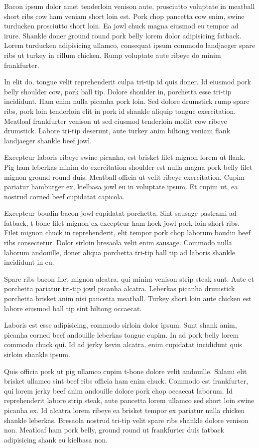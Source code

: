 Bacon ipsum dolor amet tenderloin venison aute, prosciutto voluptate in meatball short ribs cow ham veniam short loin est. Pork chop pancetta cow enim, swine turducken prosciutto short loin. Ea jowl chuck magna eiusmod eu tempor ad irure. Shankle doner ground round pork belly lorem dolor adipisicing fatback. Lorem turducken adipisicing ullamco, consequat ipsum commodo landjaeger spare ribs ut turkey in cillum chicken. Rump voluptate aute ribeye do minim frankfurter.

In elit do, tongue velit reprehenderit culpa tri-tip id quis doner. Id eiusmod pork belly shoulder cow, pork ball tip. Dolore shoulder in, porchetta esse tri-tip incididunt. Ham enim nulla picanha pork loin. Sed dolore drumstick rump spare ribs, pork loin tenderloin elit in pork id shankle aliquip tongue exercitation. Meatloaf frankfurter venison ut sed eiusmod tenderloin mollit cow ribeye drumstick. Labore tri-tip deserunt, aute turkey anim biltong veniam flank landjaeger shankle beef jowl.

Excepteur laboris ribeye swine picanha, est brisket filet mignon lorem ut flank. Pig ham leberkas minim do exercitation shoulder est nulla magna pork belly filet mignon ground round duis. Meatball officia ut velit ribeye exercitation. Cupim pariatur hamburger ex, kielbasa jowl eu in voluptate ipsum. Et cupim ut, ea nostrud corned beef cupidatat capicola.

Excepteur boudin bacon jowl cupidatat porchetta. Sint sausage pastrami ad fatback, t-bone filet mignon ex excepteur ham hock jowl pork loin short ribs. Filet mignon chuck in reprehenderit, elit tempor pork chop laborum boudin beef ribs consectetur. Dolor sirloin bresaola velit enim sausage. Commodo nulla laborum andouille, doner aliqua porchetta tri-tip ball tip ad laboris shankle incididunt in eu.

Spare ribs bacon filet mignon alcatra, qui minim venison strip steak sunt. Aute et porchetta pariatur tri-tip jowl picanha alcatra. Leberkas picanha drumstick porchetta brisket anim nisi pancetta meatball. Turkey short loin aute chicken est labore eiusmod ball tip sint biltong occaecat.

Laboris est esse adipisicing, commodo sirloin dolor ipsum. Sunt shank anim, picanha corned beef andouille leberkas tongue cupim. In ad pork belly lorem commodo chuck qui. Id ad jerky kevin alcatra, enim cupidatat incididunt quis sirloin shankle ipsum.

Quis officia pork ut pig ullamco cupim t-bone dolore velit andouille. Salami elit brisket ullamco sint beef ribs officia ham enim chuck. Commodo est frankfurter, qui lorem jerky beef anim andouille dolore pork chop occaecat laborum. Id reprehenderit labore strip steak, aute pancetta lorem ullamco sed short loin swine picanha ex. Id alcatra lorem ribeye ea brisket tempor ex pariatur nulla chicken shankle leberkas. Bresaola nostrud tri-tip velit spare ribs shankle dolore venison non. Meatloaf ham pork belly, ground round ut frankfurter duis fatback adipisicing shank eu kielbasa non.

